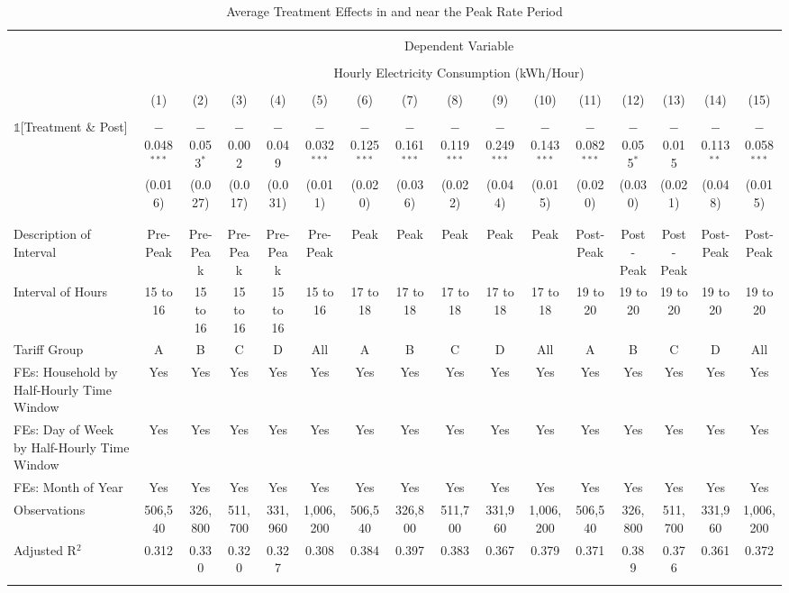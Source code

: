 
\begin{table}[!htbp] \centering 
  \caption{Average Treatment Effects in and near the Peak Rate Period} 
  \label{Table:Average-Treatment-Effects-in-and-near-the-Peak-Rate-Period} 
\small 
\begin{tabular}{@{\extracolsep{20pt}}lccccccccccccccc} 
\\[-1.8ex]\hline 
\hline \\[-1.8ex] 
 & \multicolumn{15}{c}{Dependent Variable} \\ 
\cline{2-16} 
\\[-1.8ex] & \multicolumn{15}{c}{Hourly Electricity Consumption  (kWh/Hour)} \\ 
\\[-1.8ex] & (1) & (2) & (3) & (4) & (5) & (6) & (7) & (8) & (9) & (10) & (11) & (12) & (13) & (14) & (15)\\ 
\hline \\[-1.8ex] 
 $\mathbb{1}$[Treatment \& Post] & $-$0.048$^{***}$ & $-$0.053$^{*}$ & $-$0.002 & $-$0.049 & $-$0.032$^{***}$ & $-$0.125$^{***}$ & $-$0.161$^{***}$ & $-$0.119$^{***}$ & $-$0.249$^{***}$ & $-$0.143$^{***}$ & $-$0.082$^{***}$ & $-$0.055$^{*}$ & $-$0.015 & $-$0.113$^{**}$ & $-$0.058$^{***}$ \\ 
  & (0.016) & (0.027) & (0.017) & (0.031) & (0.011) & (0.020) & (0.036) & (0.022) & (0.044) & (0.015) & (0.020) & (0.030) & (0.021) & (0.048) & (0.015) \\ 
  & & & & & & & & & & & & & & & \\ 
\hline \\[-1.8ex] 
Description of Interval & Pre-Peak & Pre-Peak & Pre-Peak & Pre-Peak & Pre-Peak & Peak & Peak & Peak & Peak & Peak & Post-Peak & Post-Peak & Post-Peak & Post-Peak & Post-Peak \\ 
Interval of Hours & 15 to 16 & 15 to 16 & 15 to 16 & 15 to 16 & 15 to 16 & 17 to 18 & 17 to 18 & 17 to 18 & 17 to 18 & 17 to 18 & 19 to 20 & 19 to 20 & 19 to 20 & 19 to 20 & 19 to 20 \\ 
Tariff Group & A & B & C & D & All & A & B & C & D & All & A & B & C & D & All \\ 
FEs: Household by Half-Hourly Time Window & Yes & Yes & Yes & Yes & Yes & Yes & Yes & Yes & Yes & Yes & Yes & Yes & Yes & Yes & Yes \\ 
FEs: Day of Week by Half-Hourly Time Window & Yes & Yes & Yes & Yes & Yes & Yes & Yes & Yes & Yes & Yes & Yes & Yes & Yes & Yes & Yes \\ 
FEs: Month of Year & Yes & Yes & Yes & Yes & Yes & Yes & Yes & Yes & Yes & Yes & Yes & Yes & Yes & Yes & Yes \\ 
Observations & 506,540 & 326,800 & 511,700 & 331,960 & 1,006,200 & 506,540 & 326,800 & 511,700 & 331,960 & 1,006,200 & 506,540 & 326,800 & 511,700 & 331,960 & 1,006,200 \\ 
Adjusted R$^{2}$ & 0.312 & 0.330 & 0.320 & 0.327 & 0.308 & 0.384 & 0.397 & 0.383 & 0.367 & 0.379 & 0.371 & 0.389 & 0.376 & 0.361 & 0.372 \\ 
\hline 
\hline \\[-1.8ex] 
\end{tabular} 
\end{table} 
